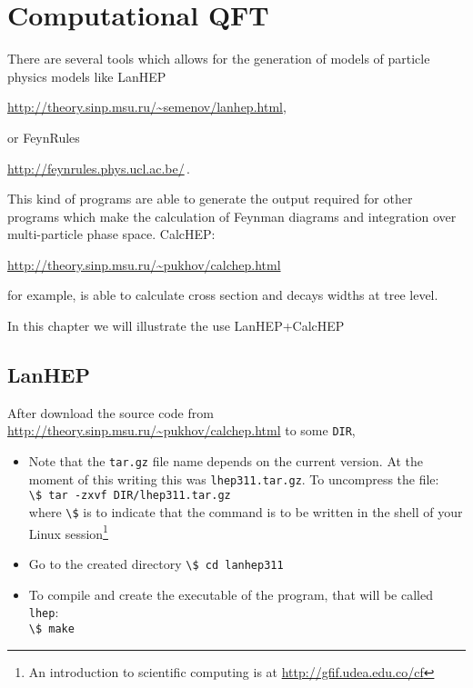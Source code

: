 
\chapter{Computational QFT}

\begin{frame}
There are several tools which allows for the generation of models of particle physics models like LanHEP \cite{Semenov:2008jy} 
\begin{center}
  \url{http://theory.sinp.msu.ru/~semenov/lanhep.html},
\end{center}
or FeynRules \cite{Christensen:2008py}
\begin{center}
  \url{http://feynrules.phys.ucl.ac.be/}\,.
\end{center}

This kind of programs are able to generate the output required for other programs which make the calculation of Feynman diagrams and integration over multi-particle phase space. CalcHEP:
\begin{center}
  \url{http://theory.sinp.msu.ru/~pukhov/calchep.html}
\end{center}
for example, is able to calculate cross section and decays widths at tree level.

\end{frame}

In this chapter we will illustrate the use LanHEP+CalcHEP

\section{LanHEP}

\begin{frame}{}
After download the source code from \url{http://theory.sinp.msu.ru/~pukhov/calchep.html} to some \lstinline{DIR}, 
\begin{itemize}
\item Note that the \lstinline{tar.gz} file name depends on the current version. At the moment of this writing this was \lstinline{lhep311.tar.gz}. To uncompress the file:\\
  \lstinline{\$ tar -zxvf DIR/lhep311.tar.gz}\\
where \lstinline{\$} is to indicate that the command is to be written in the shell of your Linux session\footnote{An introduction to scientific computing is at \url{http://gfif.udea.edu.co/cf} }
\item Go to the created directory
  \lstinline{\$ cd lanhep311}

\item To compile and create the executable of the program, that will be called \lstinline{lhep}:\\
\lstinline{\$ make}  
\end{itemize}


\end{frame}


